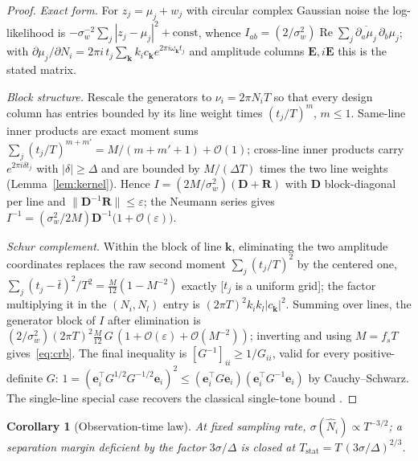 \documentclass[twocolumn,preprintnumbers,amsmath,amssymb,pra,floatfix]{revtex4-2}
\newcommand{\vect}[1]{\bm{#1}}
\newcommand{\bigO}{\mathcal{O}}
\newtheorem{corollary}{Corollary}
\begin{document}
\begin{proof}
\emph{Exact form.}  For $z_j=\mu_j+w_j$ with circular complex
Gaussian noise the log-likelihood is
$-\sigma_w^{-2}\sum_j|z_j-\mu_j|^{2}+\mathrm{const}$, whence
$I_{ab}=(2/\sigma_w^{2})\operatorname{Re}\sum_j
\overline{\partial_a\mu_j}\,\partial_b\mu_j$; with
$\partial\mu_j/\partial N_i
=2\pi i\,t_j\sum_{\vect{k}}k_ic_{\vect{k}}
e^{2\pi i\omega_{\vect{k}}t_j}$ and amplitude columns
$\vect{E},i\vect{E}$ this is the stated matrix.

\emph{Block structure.}  Rescale the generators to
$\nu_i=2\pi N_iT$ so that every design column has entries bounded by
its line weight times $(t_j/T)^{m}$, $m\le1$.  Same-line inner
products are exact moment sums
$\sum_j(t_j/T)^{m+m'}=M/(m{+}m'{+}1)+\bigO(1)$; cross-line inner
products carry $e^{2\pi i\delta t_j}$ with $|\delta|\ge\Delta$ and
are bounded by $M/(\Delta T)$ times the two line weights
(Lemma~\ref{lem:kernel}).  Hence
$I=(2M/\sigma_w^{2})(\vect{D}+\vect{R})$ with $\vect{D}$
block-diagonal per line and
$\|\vect{D}^{-1}\vect{R}\|\le\varepsilon$; the Neumann series gives
$I^{-1}=(\sigma_w^{2}/2M)\vect{D}^{-1}
\bigl(1+\bigO(\varepsilon)\bigr)$.

\emph{Schur complement.}  Within the block of line $\vect{k}$,
eliminating the two amplitude coordinates replaces the raw second
moment $\sum_j(t_j/T)^{2}$ by the centered one,
$\sum_j(t_j-\bar t)^{2}/T^{2}=\tfrac{M}{12}(1-M^{-2})$ exactly
[$t_j$ is a uniform grid]; the factor multiplying it in the
$(N_i,N_l)$ entry is $(2\pi T)^{2}k_ik_l|c_{\vect{k}}|^{2}$.
Summing over lines, the generator block of $I$ after elimination is
$(2/\sigma_w^{2})(2\pi T)^{2}\tfrac{M}{12}\,G\,
(1+\bigO(\varepsilon)+\bigO(M^{-2}))$; inverting and using $M=f_sT$
gives~\eqref{eq:crb}.  The final inequality is
$[G^{-1}]_{ii}\ge1/G_{ii}$, valid for every positive-definite $G$:
$1=(\vect{e}_i^{\top}G^{1/2}G^{-1/2}\vect{e}_i)^{2}
\le(\vect{e}_i^{\top}G\vect{e}_i)
(\vect{e}_i^{\top}G^{-1}\vect{e}_i)$ by Cauchy--Schwarz.  The
single-line special case recovers the classical single-tone bound
\cite{RifeBoorstyn1974}.
\end{proof}

\begin{corollary}[Observation-time law]
\label{cor:tscale}
At fixed sampling rate, $\sigma(\hat N_i)\propto T^{-3/2}$; a
separation margin deficient by the factor $3\sigma/\Delta$ is closed at
$T_{\mathrm{stat}}=T\,(3\sigma/\Delta)^{2/3}$.
\end{corollary}
\end{document}
